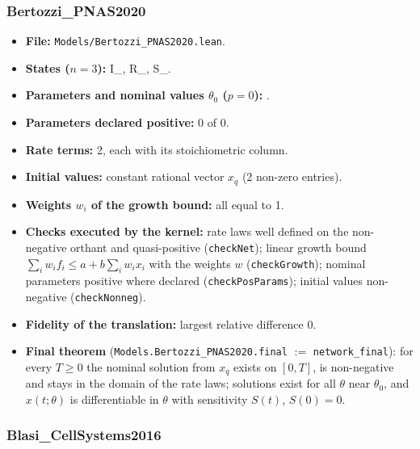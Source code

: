 \subsubsection*{Bertozzi\_PNAS2020}

\begin{itemize}\itemsep0pt\small
\item \textbf{File:} \texttt{Models/Bertozzi\_PNAS2020.lean}.
\item \textbf{States ($n=3$):} I\_, R\_, S\_.
\item \textbf{Parameters and nominal values $\theta_0$ ($p=0$):} .
\item \textbf{Parameters declared positive:} 0 of 0.
\item \textbf{Rate terms:} 2, each with its stoichiometric column.
\item \textbf{Initial values:} constant rational vector $x_q$ (2 non-zero entries).
\item \textbf{Weights $w_i$ of the growth bound:} all equal to 1.
\item \textbf{Checks executed by the kernel:} rate laws well defined on the non-negative orthant and quasi-positive (\texttt{checkNet}); linear growth bound $\sum_iw_if_i\le a+b\sum_iw_ix_i$ with the weights $w$ (\texttt{checkGrowth}); nominal parameters positive where declared (\texttt{checkPosParams}); initial values non-negative (\texttt{checkNonneg}).
\item \textbf{Fidelity of the translation:} largest relative difference 0.
\item \textbf{Final theorem} (\texttt{Models.Bertozzi\_PNAS2020.final} $:=$ \texttt{network\_final}): for every $T\ge0$ the nominal solution from $x_q$ exists on $[0,T]$, is non-negative and stays in the domain of the rate laws; solutions exist for all $\theta$ near $\theta_0$, and $x(t;\theta)$ is differentiable in $\theta$ with sensitivity $S(t)$, $S(0)=0$.
\end{itemize}

\subsubsection*{Blasi\_CellSystems2016}

